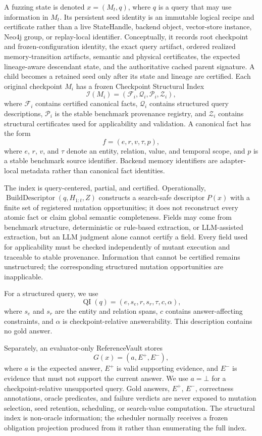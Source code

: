 A fuzzing state is denoted \(x=(M_t,q)\), where \(q\) is a query that may use
information in \(M_t\). Its persistent seed identity is an immutable logical
recipe and certificate rather than a live StateHandle, backend object,
vector-store instance, Neo4j group, or replay-local identifier. Conceptually,
it records root checkpoint and frozen-configuration identity, the exact query
artifact, ordered realized memory-transition artifacts, semantic and physical
certificates, the expected lineage-aware descendant state, and the
authoritative cached parent signature. A child becomes a retained seed only
after its state and lineage are certified. Each original checkpoint \(M_i\)
has a frozen Checkpoint Structural
Index
\[
\mathcal{I}(M_i)=(\mathcal{F}_i,\mathcal{Q}_i,\mathcal{P}_i,\mathcal{Z}_i),
\]
where \(\mathcal{F}_i\) contains certified canonical facts,
\(\mathcal{Q}_i\) contains structured query descriptions,
\(\mathcal{P}_i\) is the stable benchmark provenance registry, and
\(\mathcal{Z}_i\) contains structural certificates used for applicability and
validation. A canonical fact has the form
\[
f=(e,r,v,\tau,p),
\]
where \(e\), \(r\), \(v\), and \(\tau\) denote an entity, relation, value, and
temporal scope, and \(p\) is a stable benchmark source identifier. Backend
memory identifiers are adapter-local metadata rather than canonical fact
identities.

The index is query-centered, partial, and certified. Operationally,
\(\operatorname{BuildDescriptor}(q,H_{1:t},Z)\) constructs a search-safe
descriptor \(P(x)\) with a finite set of registered mutation opportunities;
it does not reconstruct every atomic fact or claim global semantic
completeness. Fields may come from benchmark structure,
deterministic or rule-based extraction, or LLM-assisted extraction, but an LLM
judgment alone cannot certify a field. Every field used for applicability must
be checked independently of mutant execution and traceable to stable
provenance. Information that cannot be certified remains unstructured; the
corresponding structured mutation opportunities are inapplicable.

For a structured query, we use
\[
\operatorname{QI}(q)=(e,s_e,r,s_r,\tau,c,\alpha),
\]
where \(s_e\) and \(s_r\) are the entity and relation spans, \(c\) contains
answer-affecting constraints, and \(\alpha\) is checkpoint-relative
answerability. This description contains no gold answer.

Separately, an evaluator-only ReferenceVault stores
\[
G(x)=(a,E^{+},E^{-}),
\]
where \(a\) is the expected answer, \(E^{+}\) is valid supporting evidence,
and \(E^{-}\) is evidence that must not support the current answer. We use
\(a=\bot\) for a checkpoint-relative unsupported query. Gold answers,
\(E^{+}\), \(E^{-}\), correctness annotations, oracle predicates, and failure
verdicts are never exposed to mutation selection, seed retention, scheduling,
or search-value computation. The structural index is non-oracle information;
the scheduler normally receives a frozen obligation projection produced from
it rather than enumerating the full index.


